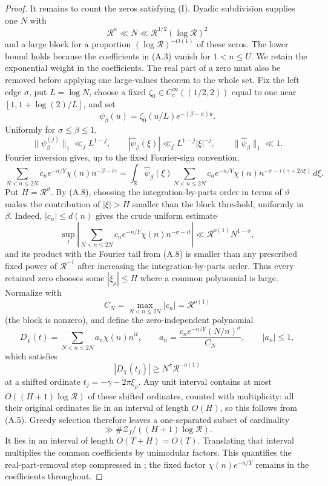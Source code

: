 \begin{proof}
It remains to count the zeros satisfying (I). Dyadic subdivision supplies
one $N$ with
\[
 \mathcal R^\kappa\ll N\ll\mathcal R^{1/2}
                    (\log\mathcal R)^2
 \tag{A.7}
\]
and a large block for a proportion $(\log\mathcal R)^{-O(1)}$ of these
zeros. The lower bound holds because the coefficients in (A.3) vanish for
$1<n\le U$.
We retain the exponential weight in the coefficients.  The real part of a
zero must also be removed before applying one large-values theorem to the
whole set. Fix the left edge $\sigma$, put $L=\log N$, choose a fixed
$\zeta_0\in C_c^\infty((1/2,2))$ equal to one near
$[1,1+\log(2)/L]$, and set
\[
 \psi_\beta(u)=\zeta_0(u/L)e^{-(\beta-\sigma)u}.
\]
Uniformly for $\sigma\le\beta\le1$,
\[
 \|\psi_\beta^{(j)}\|_1\ll_jL^{1-j},\qquad
 |\widehat\psi_\beta(\xi)|\ll_jL^{1-j}|\xi|^{-j},
 \qquad \|\widehat\psi_\beta\|_1\ll1.                         \tag{A.8}
\]
Fourier inversion gives, up to the fixed Fourier-sign convention,
\[
 \sum_{N<n\le2N}c_ne^{-n/Y}\chi(n)n^{-\beta-i\gamma}
 =\int_{\mathbb R}\widehat\psi_\beta(\xi)
   \sum_{N<n\le2N}c_ne^{-n/Y}\chi(n)
        n^{-\sigma-i(\gamma+2\pi\xi)}\,d\xi.
 \tag{A.9}
\]
Put $H=\mathcal R^\vartheta$. By (A.8), choosing the
integration-by-parts order in terms of $\vartheta$ makes the contribution of
$|\xi|>H$ smaller than the block threshold, uniformly in $\beta$. Indeed,
$|c_n|\le d(n)$ gives the crude uniform estimate
\[
 \sup_t\left|
 \sum_{N<n\le2N}c_ne^{-n/Y}\chi(n)n^{-\sigma-it}
 \right|
 \ll \mathcal R^{o(1)}N^{1-\sigma},
\]
and its product with the Fourier tail from (A.8) is smaller than any prescribed
fixed power of $\mathcal R^{-1}$ after increasing the integration-by-parts
order. Thus every
retained zero chooses some $|\xi_\rho|\le H$ where a common polynomial is
large. Normalize with
\[
 C_N=\max_{N<n\le2N}|c_n|=\mathcal R^{o(1)}
\]
(the block is nonzero), and define the zero-independent polynomial
\[
 D_\chi(t)=\sum_{N<n\le2N}a_n\chi(n)n^{it},
 \qquad a_n=\frac{c_ne^{-n/Y}(N/n)^\sigma}{C_N},
 \qquad |a_n|\le1,
 \tag{A.10}
\]
which satisfies
\[
 |D_\chi(t_j)|\ge N^\sigma\mathcal R^{-o(1)}
 \tag{A.11}
\]
at a shifted ordinate $t_j=-\gamma-2\pi\xi_\rho$. Any unit interval contains
at most $O((H+1)\log\mathcal R)$ of these shifted ordinates, counted with
multiplicity: all their original ordinates lie in an interval of length
$O(H)$, so this follows from (A.5). Greedy selection therefore leaves a
one-separated subset of cardinality
\[
 \gg\#\mathcal Z_I/((H+1)\log\mathcal R).                             \tag{A.12}
\]
It lies in an interval of length $O(T+H)=O(T)$. Translating that interval
multiplies the common coefficients by unimodular factors. This quantifies the
real-part-removal step compressed in \cite[Section~13.1]{GuthMaynard2026}; the fixed factor
$\chi(n)e^{-n/Y}$ remains in the coefficients throughout.


\end{proof}
